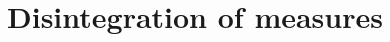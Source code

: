 \documentclass[../main]{subfiles}
\begin{document}
\section{Disintegration of measures}
\end{document}
